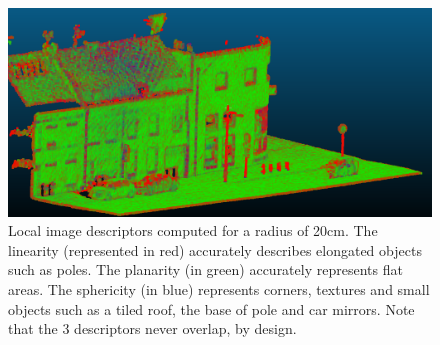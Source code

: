 \documentclass[a4paper]{article}
\begin{document}
\begin{figure}[ht]
  \centering
  \includegraphics[width=0.8\linewidth]{figures/lin_plan_sphe.png}
  \caption{Local image descriptors computed for a radius of 20cm. The linearity (represented in red) accurately describes elongated objects such as poles.
  The planarity (in green) accurately represents flat areas. The sphericity (in blue) represents corners, textures and small objects such as a tiled roof, the base of pole and car mirrors.
  Note that the 3 descriptors never overlap, by design.} 
  \label{fig:descriptors}
\end{figure}
\end{document}
